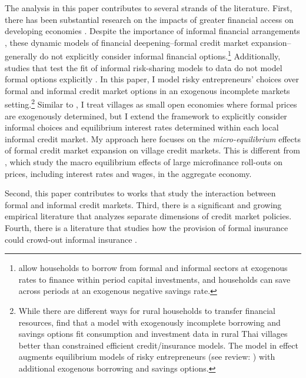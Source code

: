 The analysis in this paper contributes to several strands of the literature. First, there has been substantial research on the impacts of greater financial access on developing economies \autocite{greenwood_financial_1990, banerjee_occupational_1993, lloyd-ellis_enterprise_2000, gine_evaluation_2004, greenwood_financing_2010, kaboski_structural_2011, moll_productivity_2014, buera_macroeconomics_2012, dabla-norris_distinguishing_2018}. Despite the importance of informal financial arrangements \autocite{udry_risk_1994, townsend_risk_1994}, these dynamic models of financial deepening--formal credit market expansion--generally do not explicitly consider informal financial options.\footnote{\textcite{banerjee_credit_2017} allow households to borrow from formal and informal sectors at exogenous rates to finance within period capital investments, and households can save across periods at an exogenous negative savings rate.} Additionally, studies that test the fit of informal risk-sharing models to data do not model formal options explicitly \autocite{alem_evaluation_2014, karaivanov_dynamic_2014, kinnan_distinguishing_2017}. In this paper, I model risky entrepreneurs' choices over formal and informal credit market options in an exogenous incomplete markets setting.\footnote{While there are different ways for rural households to transfer financial resources, \textcite{karaivanov_dynamic_2014} find that a model with exogenously incomplete borrowing and savings options fit consumption and investment data in rural Thai villages better than constrained efficient credit/insurance models. The model in effect augments equilibrium models of risky entrepreneurs (see review: \textcite{quadrini_entrepreneurship_2009}) with additional exogenous borrowing and savings options.} Similar to \textcite{kaboski_structural_2011}, I treat villages as small open economies where formal prices are exogenously determined, but I extend the framework to explicitly consider informal choices and equilibrium interest rates determined within each local informal credit market. My approach here focuses on the \textit{micro-equilibrium} effects of formal credit market expansion on village credit markets. This is different from \textcite{buera_macroeconomics_2012, breza_measuring_2018}, which study the macro equilibrium effects of large microfinance roll-outs on prices, including interest rates and wages, in the aggregate economy.

Second, this paper contributes to works that study the interaction between formal and informal credit markets. Third, there is a significant and growing empirical literature that analyzes separate dimensions of credit market policies. Fourth, there is a literature that studies how the provision of formal insurance could crowd-out informal insurance \autocite{attanasio_consumption_2000,krueger_public_2011,chandrasekhar_information_2011}.


